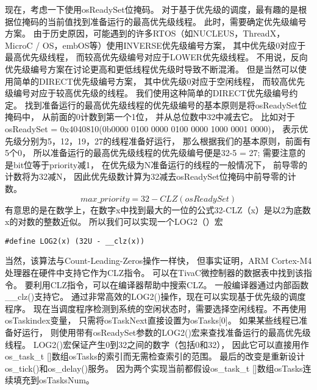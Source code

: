 现在，考虑一下使用osReadySet位掩码。
对于基于优先级的调度，最有趣的是根据位掩码的当前值找到准备运行的最高优先级线程。
此时，需要确定优先级编号方案。
由于历史原因，可能遇到的许多RTOS（如NUCLEUS，ThreadX，MicroC / OS，embOS等）使用INVERSE优先级编号方案，
其中优先级0对应于最高优先级线程，
而较高优先级编号对应于LOWER优先级线程。
不用说，反向优先级编号方案在讨论更高和更低线程优先级时导致不断混淆。
但是当然可以使用简单的DIRECT优先级编号方案，
其中优先级0对应于空闲线程，
而较高优先级编号对应于较高优先级的线程。 
我们使用这种简单的DIRECT优先级编号约定。
找到准备运行的最高优先级线程的优先级编号的基本原则是将osReadySet位掩码中，
从前面的0计数到第一个1位，
并从总位数中32中减去它。
比如对于osReadySet = 0x4040810(0b0000 0100 0000 0100 0000 1000 0001 0000)，
表示优先级分别为5，12，19，27的线程准备好运行，
那么根据我们的基本原则，前面有5个0，
所以准备运行的最高优先级线程的优先级编号便是32-5 = 27;
需要注意的是bit位等于priority减1，
在优先级为N准备运行的线程的一般情况下，
前导零的计数将为32减N，
因此优先级数计算为32减去osReadySet位掩码中前导零的计数。
$$
max\_priority = 32-CLZ(osReadySet)
$$
有意思的是在数学上，在数字x中找到最大的一位的公式32-CLZ（x）是以2为底数x的对数的整数近似。
所以我们可以实现一个LOG2（）宏
\begin{lstlisting}[language={[ANSI]C},keywordstyle=\color{blue!70},commentstyle=\color{red!50!green!50!blue!50},frame=shadowbox, rulesepcolor=\color{red!20!green!20!blue!20}]
    #define LOG2(x) (32U - __clz(x))
\end{lstlisting}
当然，该算法与Count-Leading-Zeros操作一样快，
但事实证明，ARM Cortex-M4处理器在硬件中支持它作为CLZ指令。
可以在TivaC微控制器的数据表中找到该指令。
要利用CLZ指令，可以在编译器帮助中搜索CLZ。
一般编译器通过内部函数\_\_clz()支持它。
通过非常高效的LOG2()操作，现在可以实现基于优先级的调度程序。
现在当调度程序检测到系统的空闲状态时，需要选择空闲线程。不再使用osTaskindex变量，
只需将osTaskNext直接设置为osTasks[0]。
如果某些线程已准备好运行，
则使用带有osReadySet参数的LOG2()宏来查找准备运行的最高优先级线程。
LOG2()宏保证产生0到32之间的数字（包括0和32），
因此它可以直接用作os\_task\_t []数组osTasks的索引而无需检查索引的范围。
最后的改变是重新设计os\_tick()和os\_delay()服务。
因为两个实现当前都假设os\_task\_t []数组osTasks连续填充到osTasksNum。

